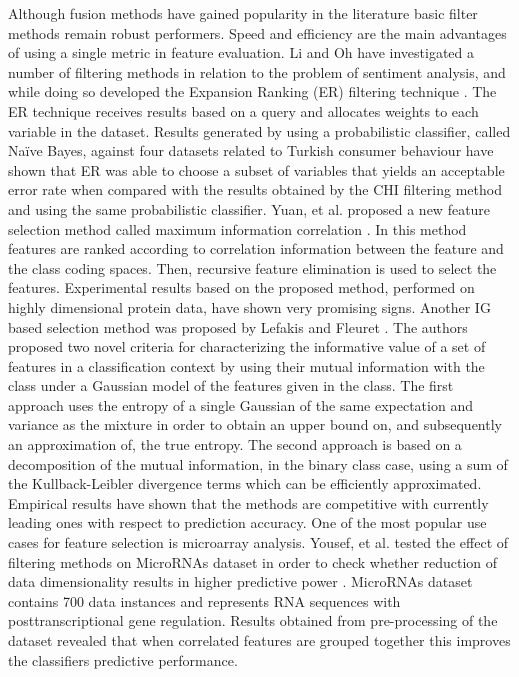 \documentclass[review]{elsarticle}
\begin{document}
Although fusion methods have gained popularity in the literature basic filter methods remain robust performers. Speed and efficiency are the main advantages of using a single metric in feature evaluation. Li and Oh have investigated a number of filtering methods in relation to the problem of sentiment analysis, and while doing so developed the Expansion Ranking (ER) filtering technique \cite{Li2016}. The ER technique receives results based on a query and allocates weights to each variable in the dataset. Results generated by using a probabilistic classifier, called Naïve Bayes, against four datasets related to Turkish consumer behaviour have shown that ER was able to choose a subset of variables that yields an acceptable error rate when compared with the results obtained by the CHI filtering method and using the same probabilistic classifier. Yuan, et al.  proposed a new feature selection method called maximum information correlation \cite{Yuan2017}. In this method features are ranked according to correlation information between the feature and the class coding spaces. Then, recursive feature elimination is used to select the features. Experimental results based on the proposed method, performed on highly dimensional protein data, have shown very promising signs. Another IG based selection method was proposed by Lefakis and Fleuret \cite{Lefakis2016}. The authors proposed two novel criteria for characterizing the informative value of a set of features in a classification context by using their mutual information with the class under a Gaussian model of the features given in the class. The first approach uses the entropy of a single Gaussian of the same expectation and variance as the mixture in order to obtain an upper bound on, and subsequently an approximation of, the true entropy. The second approach is based on a decomposition of the mutual information, in the binary class case, using a sum of the Kullback-Leibler divergence terms which can be efficiently approximated. Empirical results have shown that the methods are competitive with currently leading ones with respect to prediction accuracy. One of the most popular use cases for feature selection is microarray analysis. Yousef, et al. tested the effect of filtering methods on MicroRNAs dataset in order to check whether reduction of data dimensionality results in higher predictive power \cite{Yousef2016}. MicroRNAs dataset contains 700 data instances and represents RNA sequences with posttranscriptional gene regulation. Results obtained from pre-processing of the dataset revealed that when correlated features are grouped together this improves the classifiers predictive performance.
\end{document}
